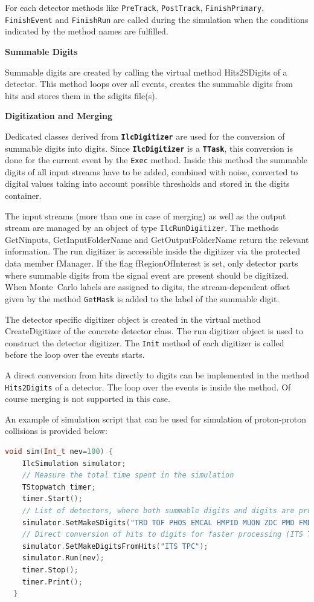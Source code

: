 \documentclass[12pt,a4paper,twoside]{article}
\makeatletter
\newcommand{\class}[1]{\texttt{\textbf{#1}}\xspace}
\newcommand{\method}[1]{\texttt{#1}\xspace}
\newcommand {\MC} {Monte~Carlo\@\xspace}
\makeatother
\begin{document}
For each detector methods like \method{PreTrack}, \method{PostTrack},
\method{FinishPrimary}, \method{FinishEvent} and \method{FinishRun}
are called during the simulation when the conditions indicated by the
method names are fulfilled.

\noindent
\textbf{Summable Digits}

Summable digits are created by calling the virtual method Hits2SDigits
of a detector. This method loops over all events, creates the summable
digits from hits and stores them in the sdigits file(s).

\noindent
\textbf{ Digitization and Merging}

Dedicated classes derived from \class{IlcDigitizer} are used for the
conversion of summable digits into digits. Since \class{IlcDigitizer}
is a \class{TTask}, this conversion is done for
the current event by the \method{Exec} method. Inside this method the summable
digits of all input streams have to be added, combined with noise,
converted to digital values taking into account possible thresholds
and stored in the digits container.

The input streams (more than one in case of merging) as well as the
output stream are managed by an object of type \method{IlcRunDigitizer}. The
methods GetNinputs, GetInputFolderName and GetOutputFolderName return
the relevant information. The run digitizer is accessible inside the
digitizer via the protected data member fManager. If the flag
fRegionOfInterest is set, only detector parts where summable digits
from the signal event are present should be digitized. When \MC labels
are assigned to digits, the stream-dependent offset given by the
method \method{GetMask} is added to the label of the summable digit.

The detector specific digitizer object is created in the virtual
method CreateDigitizer of the concrete detector class. The run
digitizer object is used to construct the detector
digitizer. The \method{Init} method of each digitizer is called before the loop
over the events starts.


A direct conversion from hits directly to digits can be implemented in
the method \method{Hits2Digits} of a detector. The loop over the events is
inside the method. Of course merging is not supported in this case.

An example of simulation script that can be used for simulation of
proton-proton collisions is provided below:

\begin{lstlisting}[language=C++, title={Simulation run}]
  void sim(Int_t nev=100) {
    IlcSimulation simulator;
    // Measure the total time spent in the simulation
    TStopwatch timer;
    timer.Start();
    // List of detectors, where both summable digits and digits are provided
    simulator.SetMakeSDigits("TRD TOF PHOS EMCAL HMPID MUON ZDC PMD FMD T0 VZERO");
    // Direct conversion of hits to digits for faster processing (ITS TPC)
    simulator.SetMakeDigitsFromHits("ITS TPC");
    simulator.Run(nev);
    timer.Stop();
    timer.Print();
  }
\end{lstlisting}
\end{document}

